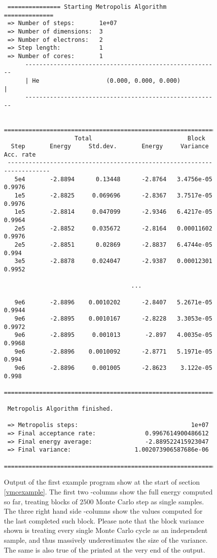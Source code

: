 \documentclass[../../master.tex]{subfiles}
\begin{document}
\begin{figure}[p]
\begin{lstlisting}
 =============== Starting Metropolis Algorithm ============== 
 => Number of steps:       1e+07      
 => Number of dimensions:  3          
 => Number of electrons:   2          
 => Step length:           1          
 => Number of cores:       1          
      ------------------------------------------------------- 
      | He                   (0.000, 0.000, 0.000)          | 
      ------------------------------------------------------- 

 =======================================================================
                    Total                           Block 
  Step       Energy     Std.dev.       Energy     Variance    Acc. rate 
 -----------------------------------------------------------------------
   5e4       -2.8894      0.13448      -2.8764   3.4756e-05       0.9976
   1e5       -2.8825     0.069696      -2.8367   3.7517e-05       0.9976
   1e5       -2.8814     0.047099      -2.9346   6.4217e-05       0.9964
   2e5       -2.8852     0.035672      -2.8164   0.00011602       0.9976
   2e5       -2.8851      0.02869      -2.8837   6.4744e-05        0.994
   3e5       -2.8878     0.024047      -2.9387   0.00012301       0.9952

                                    ...

   9e6       -2.8896    0.0010202      -2.8407   5.2671e-05       0.9944
   9e6       -2.8895    0.0010167      -2.8228   3.3053e-05       0.9972
   9e6       -2.8895     0.001013       -2.897   4.0035e-05       0.9968
   9e6       -2.8896    0.0010092      -2.8771   5.1971e-05        0.994
   9e6       -2.8896     0.001005      -2.8623    3.122e-05        0.998
 =======================================================================

 Metropolis Algorithm finished. 

 => Metropolis steps:                                1e+07   
 => Final acceptance rate:              0.9967614900486612 
 => Final energy average:               -2.889522415923047 
 => Final variance:                  1.002073906587686e-06 
 ============================================================ 
\end{lstlisting}
\caption{Output of the first example program show at the start of section \ref{vmcexample}. The first two -columns show the full energy computed so far, treating blocks of $2500$ Monte Carlo step as single samples. The three right hand side -columns show the values computed for the last completed such block. Please note that the block variance shown is treating every single Monte Carlo cycle as an independent sample, and thus massively underestimates the size of the variance. The same is also true of the printed  at the very end of the output. \label{fig:vmcexample}}
\end{figure}
\end{document}
